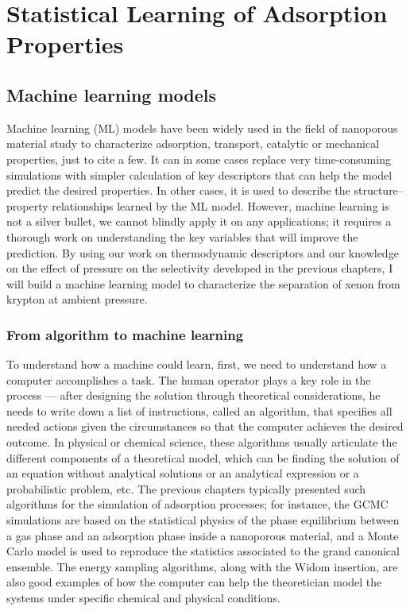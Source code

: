 \documentclass[main]{subfiles}
\begin{document}
\chapter{Statistical Learning of Adsorption Properties}
\vspace*{-1\baselineskip}

\section{Machine learning models}

Machine learning (ML) models have been widely used in the field of nanoporous material study to characterize adsorption, transport, catalytic or mechanical properties, just to cite a few. It can in some cases replace very time-consuming simulations with simpler calculation of key descriptors that can help the model predict the desired properties. In other cases, it is used to describe the structure--property relationships learned by the ML model. However, machine learning is not a silver bullet, we cannot blindly apply it on any applications; it requires a thorough work on understanding the key variables that will improve the prediction. By using our work on thermodynamic descriptors and our knowledge on the effect of pressure on the selectivity developed in the previous chapters, I will build a machine learning model to characterize the separation of xenon from krypton at ambient pressure.

\subsection{From algorithm to machine learning}

To understand how a machine could learn, first, we need to understand how a computer accomplishes a task. The human operator plays a key role in the process --- after designing the solution through theoretical considerations, he needs to write down a list of instructions, called an algorithm, that specifies all needed actions given the circumstances so that the computer achieves the desired outcome. In physical or chemical science, these algorithms usually articulate the different components of a theoretical model, which can be finding the solution of an equation without analytical solutions or an analytical expression or a probabilistic problem, etc. The previous chapters typically presented such algorithms for the simulation of adsorption processes; for instance, the GCMC simulations are based on the statistical physics of the phase equilibrium between a gas phase and an adsorption phase inside a nanoporous material, and a Monte Carlo model is used to reproduce the statistics associated to the grand canonical ensemble. The energy sampling algorithms, along with the Widom insertion, are also good examples of how the computer can help the theoretician model the systems under specific chemical and physical conditions. 
\end{document}
